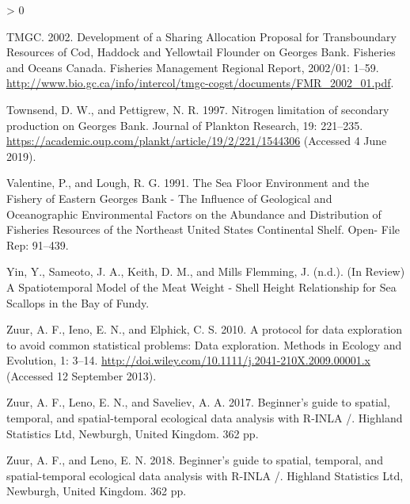 \documentclass[
]{article}
\newlength{\cslhangindent}
\newenvironment{CSLReferences}[2] %
 {%
  \setlength{\parindent}{0pt}
  \ifodd #1 \everypar{\setlength{\hangindent}{\cslhangindent}}\ignorespaces\fi
  \ifnum #2 > 0
  \setlength{\parskip}{#2\baselineskip}
  \fi
 }%
 {}
\begin{document}
\begin{CSLReferences}{1}{0}
\leavevmode\hypertarget{ref-tmgcDevelopmentSharingAllocation2002}{}%
TMGC. 2002. Development of a {Sharing Allocation Proposal} for {Transboundary Resources} of {Cod}, {Haddock} and {Yellowtail Flounder} on {Georges Bank}. Fisheries and Oceans Canada. Fisheries Management Regional Report, 2002/01: 1--59. \url{http://www.bio.gc.ca/info/intercol/tmgc-cogst/documents/FMR_2002_01.pdf}.

\leavevmode\hypertarget{ref-townsendNitrogenLimitationSecondary1997}{}%
Townsend, D. W., and Pettigrew, N. R. 1997. Nitrogen limitation of secondary production on {Georges Bank}. Journal of Plankton Research, 19: 221--235. \url{https://academic.oup.com/plankt/article/19/2/221/1544306} (Accessed 4 June 2019).

\leavevmode\hypertarget{ref-valentineSeaFloorEnvironment1991}{}%
Valentine, P., and Lough, R. G. 1991. The {Sea Floor Environment} and the {Fishery} of {Eastern Georges Bank} - {The Influence} of {Geological} and {Oceanographic Environmental Factors} on the {Abundance} and {Distribution} of {Fisheries Resources} of the {Northeast United States Continental Shelf}. Open- File Rep: 91--439.

\leavevmode\hypertarget{ref-yinReviewSpatiotemporalModel}{}%
Yin, Y., Sameoto, J. A., Keith, D. M., and Mills Flemming, J. (n.d.). ({In Review}) {A Spatiotemporal Model} of the {Meat Weight} - {Shell Height Relationship} for {Sea Scallops} in the {Bay} of {Fundy}.

\leavevmode\hypertarget{ref-zuurProtocolDataExploration2010}{}%
Zuur, A. F., Ieno, E. N., and Elphick, C. S. 2010. A protocol for data exploration to avoid common statistical problems: {Data} exploration. Methods in Ecology and Evolution, 1: 3--14. \url{http://doi.wiley.com/10.1111/j.2041-210X.2009.00001.x} (Accessed 12 September 2013).

\leavevmode\hypertarget{ref-zuurBeginnerGuideSpatial2017}{}%
Zuur, A. F., Leno, E. N., and Saveliev, A. A. 2017. Beginner's guide to spatial, temporal, and spatial-temporal ecological data analysis with {R}-{INLA} /. {Highland Statistics Ltd}, {Newburgh, United Kingdom}. 362 pp.

\leavevmode\hypertarget{ref-zuurBeginnerGuideSpatial2018}{}%
Zuur, A. F., and Leno, E. N. 2018. Beginner's guide to spatial, temporal, and spatial-temporal ecological data analysis with {R}-{INLA} /. {Highland Statistics Ltd}, {Newburgh, United Kingdom}. 362 pp.

\end{CSLReferences}
\end{document}
